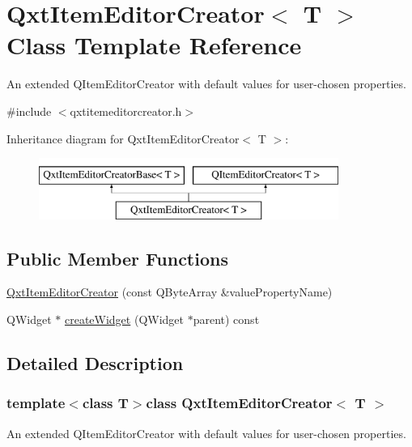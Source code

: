 \hypertarget{class_qxt_item_editor_creator}{\section{Qxt\-Item\-Editor\-Creator$<$ T $>$ Class Template Reference}
\label{class_qxt_item_editor_creator}
}


An extended Q\-Item\-Editor\-Creator with default values for user-\/chosen properties.  




{\ttfamily \#include $<$qxtitemeditorcreator.\-h$>$}

Inheritance diagram for Qxt\-Item\-Editor\-Creator$<$ T $>$\-:\begin{figure}[H]
\begin{center}
\leavevmode
\includegraphics[height=2.000000cm]{class_qxt_item_editor_creator}
\end{center}
\end{figure}
\subsection*{Public Member Functions}
\begin{DoxyCompactItemize}
\item 
\hyperlink{class_qxt_item_editor_creator_a7bb70f654ad19774e3d3276832e4ebf4}{Qxt\-Item\-Editor\-Creator} (const Q\-Byte\-Array \&value\-Property\-Name)
\item 
Q\-Widget $\ast$ \hyperlink{class_qxt_item_editor_creator_a28ed1d5156868c5dd97584c2b75554e3}{create\-Widget} (Q\-Widget $\ast$parent) const 
\end{DoxyCompactItemize}


\subsection{Detailed Description}
\subsubsection*{template$<$class T$>$class Qxt\-Item\-Editor\-Creator$<$ T $>$}

An extended Q\-Item\-Editor\-Creator with default values for user-\/chosen properties. 

